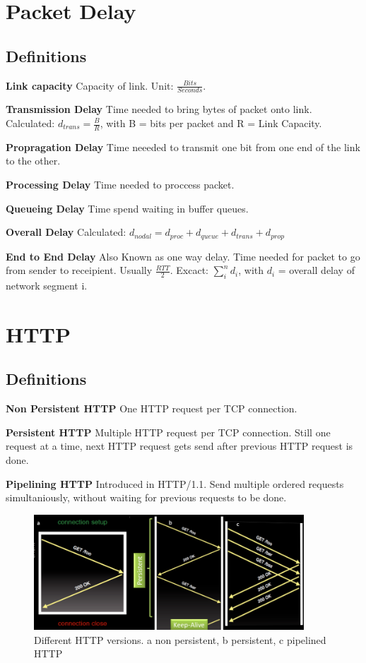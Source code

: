 \documentclass{article}
\begin{document}
\section{Packet Delay}
\subsection{Definitions}
\textbf{Link capacity}
Capacity of link. Unit: $\frac{Bits}{Seconds}$.

\textbf{Transmission Delay}
Time needed to bring bytes of packet onto link. Calculated: $d_{trans} = \frac{B}{R}$, with B = bits per packet and R = Link Capacity.

\textbf{Propragation Delay}
Time neeeded to transmit one bit from one end of the link to the other. 

\textbf{Processing Delay}
Time needed to proccess packet.

\textbf{Queueing Delay}
Time spend waiting in buffer queues.

\textbf{Overall Delay}
Calculated: $d_{nodal} = d_{proc} + d_{queue} + d_{trans} + d_{prop}$

\textbf{End to End Delay}
Also Known as one way delay. Time needed for packet to go from sender to receipient. Usually $\frac{RTT}{2}$. Excact: $\sum\limits_{i}^{n} d_{i}$, with $d_{i}$ = overall delay of network segment i.

\section{HTTP}
\subsection{Definitions}
\textbf{Non Persistent HTTP}
One HTTP request per TCP connection.

\textbf{Persistent HTTP}
Multiple HTTP request per TCP connection. Still one request at a time, next HTTP request gets send after previous HTTP request is done.

\textbf{Pipelining HTTP}
Introduced in HTTP/1.1. Send multiple ordered requests simultaniously, without waiting for previous requests to be done.

\begin{figure}[h]
    \centering
    \includegraphics[width=0.9\textwidth]{media/http.png}
    \caption{Different HTTP versions. a non persistent, b persistent, c pipelined HTTP}
    \label{fig:pipe_http}
\end{figure}
\end{document}
